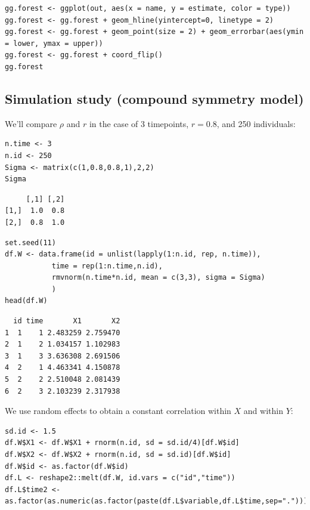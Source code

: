 \documentclass[12pt]{article}
\begin{document}
\lstset{language=r,label= ,caption= ,captionpos=b,numbers=none}
\begin{lstlisting}
gg.forest <- ggplot(out, aes(x = name, y = estimate, color = type))
gg.forest <- gg.forest + geom_hline(yintercept=0, linetype = 2)
gg.forest <- gg.forest + geom_point(size = 2) + geom_errorbar(aes(ymin = lower, ymax = upper))
gg.forest <- gg.forest + coord_flip() 
gg.forest
\end{lstlisting}

\subsection{Simulation study (compound symmetry model)}
\label{sec:org6ca2fe1}

We'll compare \(\rho\) and \(r\) in the case of 3 timepoints,
\(r=0.8\), and 250 individuals:
\lstset{language=r,label= ,caption= ,captionpos=b,numbers=none}
\begin{lstlisting}
n.time <- 3
n.id <- 250
Sigma <- matrix(c(1,0.8,0.8,1),2,2)
Sigma
\end{lstlisting}

\begin{verbatim}
     [,1] [,2]
[1,]  1.0  0.8
[2,]  0.8  1.0
\end{verbatim}


\lstset{language=r,label= ,caption= ,captionpos=b,numbers=none}
\begin{lstlisting}
set.seed(11)
df.W <- data.frame(id = unlist(lapply(1:n.id, rep, n.time)),
		   time = rep(1:n.time,n.id),
		   rmvnorm(n.time*n.id, mean = c(3,3), sigma = Sigma)
		   )
head(df.W)
\end{lstlisting}

\begin{verbatim}
  id time       X1       X2
1  1    1 2.483259 2.759470
2  1    2 1.034157 1.102983
3  1    3 3.636308 2.691506
4  2    1 4.463341 4.150878
5  2    2 2.510048 2.081439
6  2    3 2.103239 2.317938
\end{verbatim}


\clearpage

We use random effects to obtain a constant correlation within \(X\)
and within \(Y\):
\lstset{language=r,label= ,caption= ,captionpos=b,numbers=none}
\begin{lstlisting}
sd.id <- 1.5
df.W$X1 <- df.W$X1 + rnorm(n.id, sd = sd.id/4)[df.W$id]
df.W$X2 <- df.W$X2 + rnorm(n.id, sd = sd.id)[df.W$id]
df.W$id <- as.factor(df.W$id)
df.L <- reshape2::melt(df.W, id.vars = c("id","time")) 
df.L$time2 <- as.factor(as.numeric(as.factor(paste(df.L$variable,df.L$time,sep="."))))
\end{lstlisting}
\end{document}
